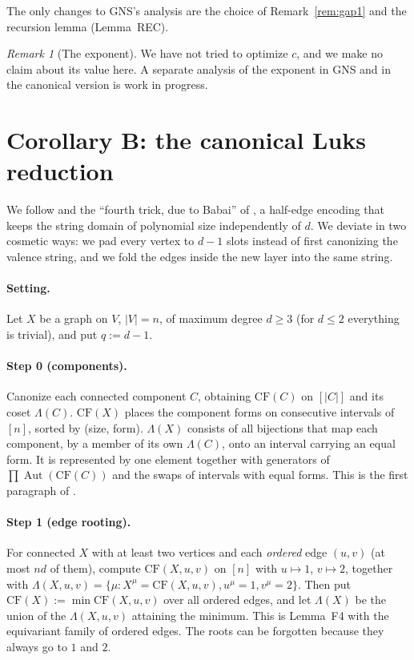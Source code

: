 \documentclass[11pt]{article}
\theoremstyle{plain}
\theoremstyle{definition}
\theoremstyle{remark}
\newtheorem{remark}[theorem]{Remark}
\theoremstyle{named}
\theoremstyle{namedrm}
\newcommand{\Aut}{\operatorname{Aut}}
\begin{document}
The only changes to GNS's analysis are the choice of Remark~\ref{rem:gap1} and the recursion lemma
(Lemma~REC).

\begin{remark}[The exponent]
We have not tried to optimize $c$, and we make no claim about its value here. A separate analysis of
the exponent in GNS and in the canonical version is work in progress.
\end{remark}

\section{Corollary B: the canonical Luks reduction}\label{sec:luks}

We follow \cite[\S4.3, Thm.~4.2]{BL83} and the ``fourth trick, due to Babai'' of \cite[\S4.2]{BL83}, a
half-edge encoding that keeps the string domain of polynomial size independently of $d$. We deviate in
two cosmetic ways: we pad every vertex to $d-1$ slots instead of first canonizing the valence string, and
we fold the edges inside the new layer into the same string.

\paragraph{Setting.} Let $X$ be a graph on $V$, $|V|=n$, of maximum degree $d\ge3$ (for $d\le2$ everything
is trivial), and put $q:=d-1$.

\paragraph{Step 0 (components).} Canonize each connected component $C$, obtaining $\mathrm{CF}(C)$ on
$[|C|]$ and its coset $\Lambda(C)$. $\mathrm{CF}(X)$ places the component forms on consecutive intervals of
$[n]$, sorted by (size, form). $\Lambda(X)$ consists of all bijections that map each component, by a member of
its own $\Lambda(C)$, onto an interval carrying an equal form. It is represented by one element together
with generators of $\prod\Aut(\mathrm{CF}(C))$ and the swaps of intervals with equal forms. This is the first
paragraph of \cite[\S4.3]{BL83}.

\paragraph{Step 1 (edge rooting).} For connected $X$ with at least two vertices and each \emph{ordered}
edge $(u,v)$ (at most $nd$ of them), compute $\mathrm{CF}(X,u,v)$ on $[n]$ with $u\mapsto1$, $v\mapsto2$, together
with $\Lambda(X,u,v)=\{\mu:X^\mu=\mathrm{CF}(X,u,v),u^\mu=1,v^\mu=2\}$. Then put $\mathrm{CF}(X):=\min\mathrm{CF}(X,u,v)$
over all ordered edges, and let $\Lambda(X)$ be the union of the $\Lambda(X,u,v)$ attaining the minimum. This is
Lemma~F4 with the equivariant family of ordered edges. The roots can be forgotten because they always
go to $1$ and $2$.
\end{document}

